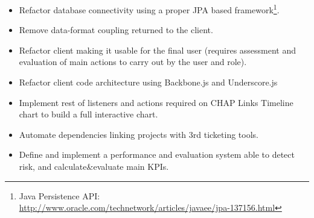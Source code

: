 \begin{itemize}
	\item Refactor database connectivity using a proper JPA based
	framework\footnote{Java Persistence API:
	\url{http://www.oracle.com/technetwork/articles/javaee/jpa-137156.html}}.
	\item Remove data-format coupling returned to the client.
	\item Refactor client making it usable for the final user (requires assessment
	and evaluation of main actions to carry out by the user and role).
	\item Refactor client code architecture using Backbone.js and Underscore.js
	\item Implement rest of listeners and actions required on CHAP Links Timeline
	chart to build a full interactive chart.
	\item Automate dependencies linking projects with 3rd ticketing tools.
	\item Define and implement a performance and evaluation system able to detect
	risk, and calculate&evaluate main KPIs.
\end{itemize}


